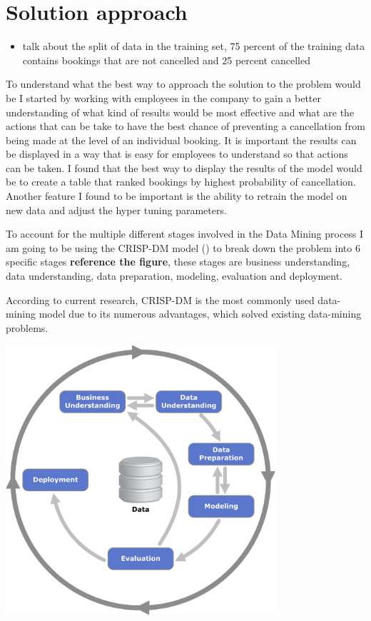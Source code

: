 \section{Solution approach}

\begin{itemize}
\item talk about the split of data in the training set, 75 percent of the training data contains bookings that are not cancelled and 25 percent cancelled 
\end{itemize}


To understand what the best way to approach the solution to the problem would be I started by working with employees in the company to gain a better understanding of what kind of results would be most effective and what are the actions that can be take to have the best chance of preventing a cancellation from being made at the level of an individual booking. It is important the results can be displayed in a way that is easy for employees to understand so that actions can be taken. I found that the best way to display the results of the model would be to create a table that ranked bookings by highest probability of cancellation. Another feature I found to be important is the ability to retrain the model on new data and adjust the hyper tuning parameters.

To account for the multiple different stages involved in the Data Mining process I am going to be using the CRISP-DM model (\cite{WirthCRISP-DM:Mining}) to break down the problem into 6 specific stages \textbf{reference the figure}, these stages are business understanding, data understanding, data preparation, modeling, evaluation and deployment.

According to current research, CRISP-DM is the most commonly used data-mining model due to its numerous advantages, which solved existing data-mining problems. 


\vspace{5mm}


 \includegraphics[width=10cm]{figures/CRISPDM_Process_Diagram.png}
 



